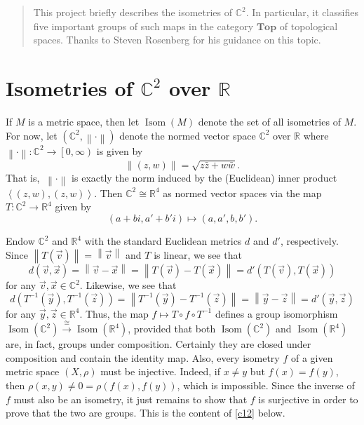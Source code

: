 \documentclass[10pt,letterpaper,cm]{nupset}
\theoremstyle{definition}
\theoremstyle{theorem}
\theoremstyle{remark}
\newcommand{\C}{\mathbb C}
\newcommand{\R}{\mathbb R}
\newcommand{\1}{\mathbf{1}}
\renewcommand{\v}{\vec v}
\newcommand{\x}{\vec x}
\newcommand{\y}{\vec y}
\newcommand{\z}{\vec z}
\newcommand{\0}{\vec {0}}
\DeclareMathOperator{\Isom}{Isom}
\begin{document}
\begin{abstract}
This project briefly describes the isometries of $\C^2$. In particular, it classifies five important groups of such maps in the category $\mathbf{Top}$ of topological spaces. Thanks to Steven Rosenberg for his guidance on this topic.
\end{abstract}

\smallskip

\section{Isometries of $\C^2$ over $\R$}

If $M$ is a metric space, then let $\Isom(M)$ denote the set of all isometries of $M$. For now, let $\left(\C^2,  \left\lVert{\cdot}\right\rVert\right)$ denote the normed vector space $\C^2$ over $\R$ where $ \left\lVert{\cdot}\right\rVert : \C^2\to \left[0,\infty\right)$ is given by  $$ \left\lVert{(z,w)}\right\rVert=\sqrt{z\bar{z}+w\bar{w}}.$$ That is, $\ \left\lVert{\cdot}\right\rVert$ is exactly the norm induced by the (Euclidean) inner product $\left\langle (z,w), (z,w) \right\rangle$. Then $\C^2\cong \R^4$ as normed vector spaces via the map $T: \C^2 \to \R^4$ given by 
\[ \label{eqn:T}
\left(a+bi, a'+b'i\right)\mapsto \left(a,a',b,b'\right)
\tag{$\ast$}.\] 


	Endow $\C^2$ and $\R^4$ with the standard Euclidean metrics $d$ and $d'$, respectively. Since $ \left\lVert{T(\v)}\right\rVert= \left\lVert{\v}\right\rVert$ and $T$ is linear, we see that $$d(\v, \x)= \left\lVert{\v-\x}\right\rVert= \left\lVert{T(\v) -T(\x)}\right\rVert=d'(T(\v), T(\x))$$ for any $\v, \x \in \C^2.$ Likewise, we see that $$d(T^{-1}(\y), T^{-1}(\z))= \left\lVert{T^{-1}(\y)-T^{-1}(\z)}\right\rVert= \left\lVert{\y-\z}\right\rVert=d'(\y,\z)$$ for any $\y, \z \in \R^4$.
Thus, the map $f\mapsto T\circ f \circ T^{-1}$ defines a group isomorphism $\Isom(\C^2) \overset{\cong}{\longrightarrow} \Isom(\R^4)$, provided that both $\Isom(\C^2)$ and $\Isom(\R^4)$ are, in fact, groups under composition. Certainly they are closed under composition and contain the identity map. Also, every isometry $f$ of a given metric space $\left(X, \rho\right)$ must be injective. Indeed, if $x\ne y$ but $f(x)=f(y)$, then $\rho(x,y)\ne 0 = \rho(f(x),f(y))$, which is impossible. Since the inverse of $f$ must also be an isometry, it just remains to show that $f$ is surjective in order to prove that the two are groups. This is the content of \cref{c12} below. 

\medskip
\end{document}

